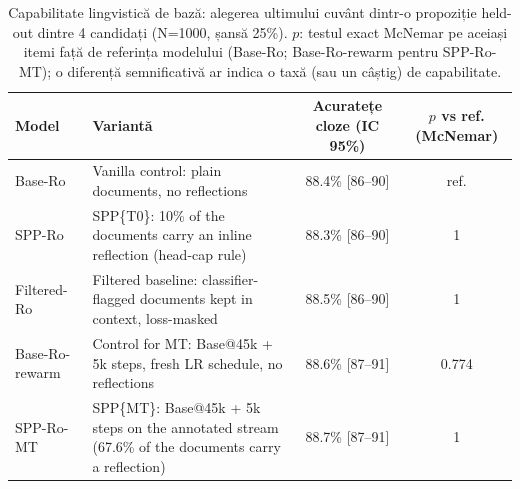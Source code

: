 \begin{table}[htbp]
\centering
\small
\begin{tabular}{l l c c}
\toprule
\textbf{Model} & \textbf{Variantă} & \textbf{Acuratețe cloze (IC 95\%)} & \textbf{$p$ vs ref. (McNemar)} \\
\midrule
Base-Ro & Vanilla control: plain documents, no reflections & 88.4\% [86--90] & ref. \\
SPP-Ro & SPP\{T0\}: 10\% of the documents carry an inline reflection (head-cap rule) & 88.3\% [86--90] & 1 \\
Filtered-Ro & Filtered baseline: classifier-flagged documents kept in context, loss-masked & 88.5\% [86--90] & 1 \\
Base-Ro-rewarm & Control for MT: Base@45k + 5k steps, fresh LR schedule, no reflections & 88.6\% [87--91] & 0.774 \\
SPP-Ro-MT & SPP\{MT\}: Base@45k + 5k steps on the annotated stream (67.6\% of the documents carry a reflection) & 88.7\% [87--91] & 1 \\
\bottomrule
\end{tabular}
\caption{Capabilitate lingvistică de bază: alegerea ultimului cuvânt dintr-o propoziție held-out dintre 4 candidați (N=1000, șansă 25\%). $p$: testul exact McNemar pe aceiași itemi față de referința modelului (Base-Ro; Base-Ro-rewarm pentru SPP-Ro-MT); o diferență semnificativă ar indica o taxă (sau un câștig) de capabilitate.}
\label{tab:thesis_capabilities}
\end{table}
